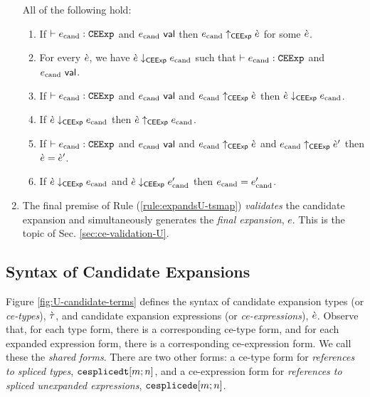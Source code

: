 \begin{enumerate}
\begin{condition} All of the following hold:
\begin{enumerate}
\item If $\vdash e_\text{cand} : \mathtt{CEExp}$ and $e_\text{cand}~\mathsf{val}$ then $e_\text{cand} \uparrow_\mathsf{CEExp} \grave{e}$ for some $\grave{e}$.
\item For every $\grave{e}$, we have $\grave{e} \downarrow_\mathsf{CEExp} e_\text{cand}$ such that $\vdash e_\text{cand} : \mathtt{CEExp}$ and $e_\text{cand}~\mathsf{val}$.
\item If $\vdash e_\text{cand} : \mathtt{CEExp}$ and $e_\text{cand}~\mathsf{val}$ and $e_\text{cand} \uparrow_\mathsf{CEExp} \grave{e}$ then $\grave{e} \downarrow_\mathsf{CEExp} e_\text{cand}$.
\item If $\grave{e} \downarrow_\mathsf{CEExp} e_\text{cand}$ then $\grave{e} \uparrow_\mathsf{CEExp} e_\text{cand}$.
\item If $\vdash e_\text{cand} : \mathtt{CEExp}$ and $e_\text{cand}~\mathsf{val}$ and $e_\text{cand} \uparrow_\mathsf{CEExp} \grave{e}$ and $e_\text{cand} \uparrow_\mathsf{CEExp} \grave{e}'$ then $\grave{e}=\grave{e}'$.
\item If $\grave{e} \downarrow_\mathsf{CEExp} e_\text{cand}$ and $\grave{e} \downarrow_\mathsf{CEExp} e_\text{cand}'$ then $e_\text{cand}=e_\text{cand}'$.
\end{enumerate}
\end{condition}

\item The final premise of Rule (\ref{rule:expandsU-tsmap}) \emph{validates} the candidate expansion and simultaneously generates the \emph{final expansion}, $e$. This is the topic of Sec. \ref{sec:ce-validation-U}.
\end{enumerate}
\subsection{Syntax of Candidate Expansions}\label{sec:ce-syntax-U}
Figure \ref{fig:U-candidate-terms} defines the syntax of candidate expansion types (or \emph{ce-types}), $\grave{\tau}$, and candidate expansion expressions  (or \emph{ce-expressions}), $\grave{e}$. Observe that, for each type form, there is a corresponding ce-type form, and for each expanded expression form, there is a corresponding ce-expression form. We call these the \emph{shared forms}. There are two other forms: a ce-type form for \emph{references to spliced types}, $\texttt{cesplicedt}[m; n]$, and a ce-expression form for \emph{references to spliced unexpanded expressions}, $\texttt{cesplicede}[m; n]$. %

